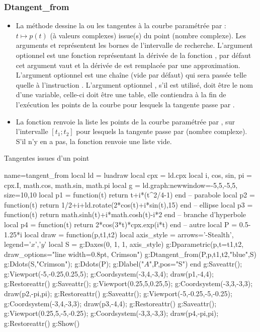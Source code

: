 \subsubsection{Dtangent\_from}
\begin{itemize}
    \item La méthode  dessine la ou les tangentes à la courbe paramétrée par : \(t \mapsto p(t)\) (à valeurs complexes) issue(s) du point  (nombre complexe). Les arguments  et  représentent les bornes de l'intervalle de recherche. L'argument optionnel  est une fonction représentant la dérivée de la fonction , par défaut cet argument vaut \nil et la dérivée de  est remplacée par une approximation. L'argument optionnel  est une chaîne (vide par défaut) qui sera passée telle quelle à l'instruction \drawcmd. L'argument optionnel , s'il est utilisé, doit être le nom d'une variable, celle-ci doit être une table, elle contiendra à la fin de l'exécution les points de la courbe pour lesquels la tangente passe par . \arguScale
    \item La fonction  renvoie la liste les points de la courbe paramétrée par , sur l'intervalle \([t_1;t_2]\) pour lesquels la tangente passe par  (nombre complexe). S'il n'y en a pas, la fonction renvoie une liste vide.
\end{itemize}

\begin{demo}{Tangentes issues d'un point}
\begin{luadraw}{name=tangent_from}
local ld = luadraw
local cpx = ld.cpx
local i, cos, sin, pi = cpx.I, math.cos, math.sin, math.pi
local g = ld.graph:new{window={-5,5,-5,5}, size={10,10}}
local p1 = function(t) return t+i*(t^2/4-1) end -- parabole
local p2 = function(t) return 1/2+i+ld.rotate(2*cos(t)+i*sin(t),15) end -- ellipse
local p3 = function(t) return math.sinh(t)+i*math.cosh(t)-i*2 end -- branche d'hyperbole
local p4 = function(t) return 2*cos(3*t)*cpx.exp(i*t) end -- autre
local P = 0.5-1.25*i
local draw = function(p,t1,t2)
    local axis_style = { arrows='-Stealth', legend={'$x$','$y$'} }
    local S = {}
    g:Daxes({0, 1, 1}, axis_style)
    g:Dparametric(p,{t={t1,t2}, draw_options="line width=0.8pt, Crimson"})
    g:Dtangent_from(P,p,t1,t2,"blue",S)
    g:Ddots(S,"Crimson"); g:Ddots(P); g:Dlabel("$A$",P,{pos="S"})
end
g:Saveattr(); g:Viewport(-5,-0.25,0.25,5); g:Coordsystem(-3,4,-3,4); draw(p1,-4,4); g:Restoreattr()
g:Saveattr(); g:Viewport(0.25,5,0.25,5); g:Coordsystem(-3,3,-3,3); draw(p2,-pi,pi); g:Restoreattr()
g:Saveattr(); g:Viewport(-5,-0.25,-5,-0.25); g:Coordsystem(-3,4,-3,3); draw(p3,-4,4); g:Restoreattr()
g:Saveattr(); g:Viewport(0.25,5,-5,-0.25); g:Coordsystem(-3,3,-3,3); draw(p4,-pi,pi); g:Restoreattr()
g:Show()
\end{luadraw}
\end{demo}

